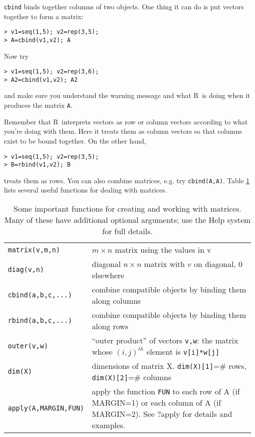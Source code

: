\documentclass [11pt]{article}
\newcommand{\ttt}[1]{{\tt #1}}
\newcommand{\code}[1]{{\tt #1}}
\newcommand\R{{\sf R}}
\numberwithin{exercise}{section}
\begin{document}
\texttt{cbind} binds together columns of two objects. One thing it can do
is put vectors together to form a matrix: 
\begin{verbatim}
> v1=seq(1,5); v2=rep(3,5);
> A=cbind(v1,v2); A	
\end{verbatim}
Now try 
\begin{verbatim}
> v1=seq(1,5); v2=rep(3,6);
> A2=cbind(v1,v2); A2
\end{verbatim}
and make sure you understand the warning message and what \R\ is doing when it produces the matrix \code{A}. 

Remember that \R\ interprets vectors as row or column vectors according to
what you're doing with them. Here it treats them as column vectors so that 
columns exist to be bound together. On the other hand, 
\begin{verbatim}
> v1=seq(1,5); v2=rep(3,5);
> B=rbind(v1,v2); B
\end{verbatim}
treats them as rows. You can also combine matrices, e.g. try \code{cbind(A,A)}. Table \ref{MatrixFunctions} lists several useful functions for dealing with matrices.


\begin{table}[t]
\begin{tabular}{p{120pt}p{300pt}}
\hline
{\tt matrix(v,m,n)} & $m \times n$ matrix using the values in v \\
{\tt diag(v,n)} & diagonal $n \times n$ matrix with $v$ on diagonal, 0 elsewhere \\
{\tt cbind(a,b,c,...)} & combine compatible objects by binding them along columns \\
{\tt rbind(a,b,c,...)} & combine compatible objects by binding them along rows \\
{\tt outer(v,w)} & ``outer product'' of vectors \ttt{v,w}: the matrix whose $(i,j)^{th}$
element is \ttt{v[i]*w[j]} \\
{\tt dim(X)} & dimensions of matrix X. \ttt{dim(X)[1]}=\# rows, \ttt{dim(X)[2]}=\# columns \\
{\tt apply(A,MARGIN,FUN)} & apply the function \ttt{FUN} to each row of A (if MARGIN=1) or each 
column of A (if MARGIN=2). See ?apply for details and examples. \\
\hline
\end{tabular}
\caption{Some important functions for creating and working with matrices. Many
of these have additional optional arguments; use the Help system for full details.}
\label{MatrixFunctions}
\end{table}
\end{document}
